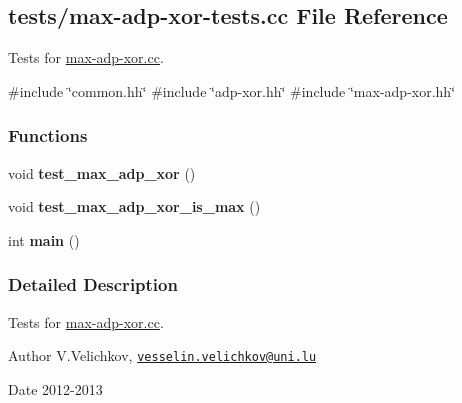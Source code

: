 \hypertarget{max-adp-xor-tests_8cc}{\subsection{tests/max-\/adp-\/xor-\/tests.cc \-File \-Reference}
\label{max-adp-xor-tests_8cc}
}


\-Tests for \hyperlink{max-adp-xor_8cc}{max-\/adp-\/xor.\-cc}.  


{\ttfamily \#include \char`\"{}common.\-hh\char`\"{}}\*
{\ttfamily \#include \char`\"{}adp-\/xor.\-hh\char`\"{}}\*
{\ttfamily \#include \char`\"{}max-\/adp-\/xor.\-hh\char`\"{}}\*
\subsubsection*{\-Functions}
\begin{DoxyCompactItemize}
\item 
\hypertarget{max-adp-xor-tests_8cc_a015a8a61914ad8b31a5dffa6652252e7}{void {\bfseries test\-\_\-max\-\_\-adp\-\_\-xor} ()}\label{max-adp-xor-tests_8cc_a015a8a61914ad8b31a5dffa6652252e7}

\item 
\hypertarget{max-adp-xor-tests_8cc_aa3f8b1110e9515f2260dbe937f430e1c}{void {\bfseries test\-\_\-max\-\_\-adp\-\_\-xor\-\_\-is\-\_\-max} ()}\label{max-adp-xor-tests_8cc_aa3f8b1110e9515f2260dbe937f430e1c}

\item 
\hypertarget{max-adp-xor-tests_8cc_ae66f6b31b5ad750f1fe042a706a4e3d4}{int {\bfseries main} ()}\label{max-adp-xor-tests_8cc_ae66f6b31b5ad750f1fe042a706a4e3d4}

\end{DoxyCompactItemize}


\subsubsection{\-Detailed \-Description}
\-Tests for \hyperlink{max-adp-xor_8cc}{max-\/adp-\/xor.\-cc}. \begin{DoxyAuthor}{\-Author}
\-V.\-Velichkov, \href{mailto:vesselin.velichkov@uni.lu}{\tt vesselin.\-velichkov@uni.\-lu} 
\end{DoxyAuthor}
\begin{DoxyDate}{\-Date}
2012-\/2013 
\end{DoxyDate}
